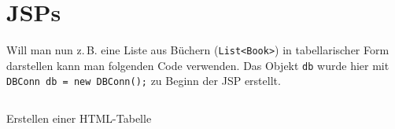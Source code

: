 \documentclass[11pt, DIV=14]{scrartcl}
\let\java\texttt
\newcommand{\zB}{\mbox{z.\,B.}\xspace}
\begin{document}
		\section{JSPs}

		Will man nun \zB eine Liste aus Büchern (\java{List<Book>}) in tabellarischer Form darstellen kann man folgenden Code verwenden.
		Das Objekt \java{db} wurde hier mit \java{DBConn db = new DBConn();} zu Beginn der JSP erstellt.

		\begin{listing}[H]
			\inputminted[firstline=37, lastline=51, gobble=4]{jsp}{code/index.jsp}
			\caption{Erstellen einer HTML-Tabelle}
		\end{listing}
\end{document}
